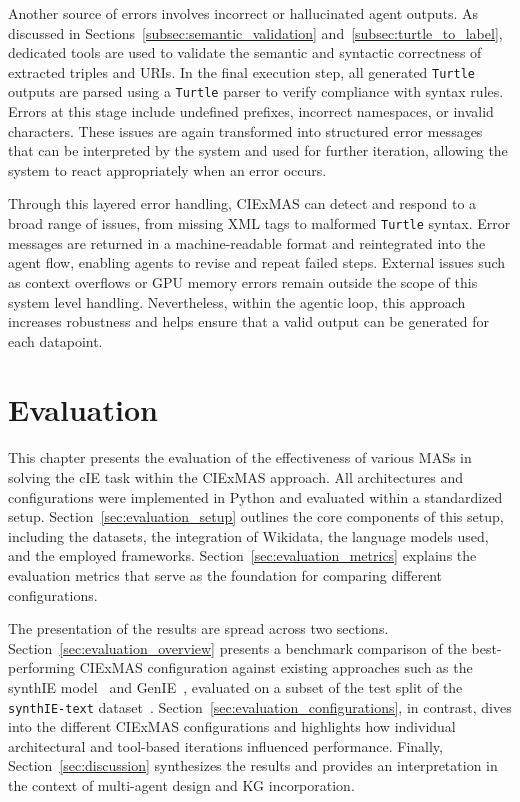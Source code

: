 \documentclass[a4paper,oneside,bibliography=totoc]{scrbook}
\begin{document}
Another source of errors involves incorrect or hallucinated agent outputs. As discussed in Sections~\ref{subsec:semantic_validation} and~\ref{subsec:turtle_to_label}, dedicated tools are used to validate the semantic and syntactic correctness of extracted triples and \acp{URI}. In the final execution step, all generated \texttt{Turtle} outputs are parsed using a \texttt{Turtle} parser to verify compliance with syntax rules. Errors at this stage include undefined prefixes, incorrect namespaces, or invalid characters. These issues are again transformed into structured error messages that can be interpreted by the system and used for further iteration, allowing the system to react appropriately when an error occurs.

Through this layered error handling, CIExMAS can detect and respond to a broad range of issues, from missing XML tags to malformed \texttt{Turtle} syntax. Error messages are returned in a machine-readable format and reintegrated into the agent flow, enabling agents to revise and repeat failed steps. External issues such as context overflows or GPU memory errors remain outside the scope of this system level handling. Nevertheless, within the agentic loop, this approach increases robustness and helps ensure that a valid output can be generated for each datapoint.

\chapter{Evaluation}
\label{ch:evaluation}

This chapter presents the evaluation of the effectiveness of various \acp{MAS} in solving the \ac{cIE} task within the CIExMAS approach. All architectures and configurations were implemented in Python and evaluated within a standardized setup. Section~\ref{sec:evaluation_setup} outlines the core components of this setup, including the datasets, the integration of Wikidata, the language models used, and the employed frameworks. Section~\ref{sec:evaluation_metrics} explains the evaluation metrics that serve as the foundation for comparing different configurations.

The presentation of the results are spread across two sections. Section~\ref{sec:evaluation_overview} presents a benchmark comparison of the best-performing CIExMAS configuration against existing approaches such as the synthIE model~\cite{Josifoski2023} and GenIE~\cite{Josifoski2021}, evaluated on a subset of the test split of the \texttt{synthIE-text} dataset~\cite{Josifoski2023}. Section~\ref{sec:evaluation_configurations}, in contrast, dives into the different CIExMAS configurations and highlights how individual architectural and tool-based iterations influenced performance. Finally, Section~\ref{sec:discussion} synthesizes the results and provides an interpretation in the context of multi-agent design and \ac{KG} incorporation.
\end{document}
